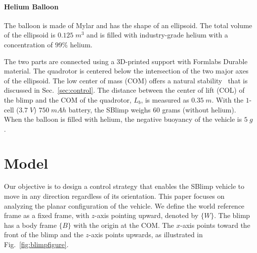 \documentclass[conference]{ieeeconf}
\newcommand{\david}[1]{{\color{blue}#1}}
\begin{document}
\paragraph{Helium Balloon} The balloon is made of Mylar and has the shape of an ellipsoid. The total volume of the ellipsoid is $0.125\; m^3$ and is filled with industry-grade helium with a concentration of $99\%$ helium.
    
The two parts are connected using a 3D-printed support with Formlabs Durable material. The quadrotor is centered below the intersection of the two major axes of the ellipsoid. 
The low center of mass (COM) offers a natural stability~\cite{7106503} that is discussed in Sec.~\ref{sec:control}. The distance between the center of lift (COL) of the blimp and the COM of the quadrotor, $L_b$, is measured as $0.35\; m$. With the $1$-cell ($3.7\; V$) $750\; mAh$ battery, the SBlimp weighs $60$ grams (without helium). When the balloon is filled with helium, the negative buoyancy of the vehicle is $5\; g$.





\section{Model}
Our objective is to design a control strategy that enables the SBlimp vehicle to move in any direction regardless of its orientation.
This paper focuses on analyzing the planar configuration of the vehicle. 
We define the world reference frame as a fixed frame, with $z$-axis pointing upward, denoted by $\{W\}$. The blimp has a body frame $\{B\}$ with the origin at the COM. The $x$-axis points toward the front of the blimp and the $z$-axis points upwards, as illustrated in Fig.~\ref{fig:blimpfigure}. 
\end{document}
